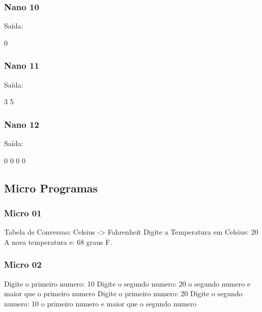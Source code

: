 \documentclass[12pt,a4paper,twoside]{report}
\begin{document}
\subsubsection{Nano 10}


Saída:
\begin{terminal}
0
\end{terminal}

\subsubsection{Nano 11}


Saída:
\begin{terminal}
3
5
\end{terminal}

\subsubsection{Nano 12}


Saída:
\begin{terminal}
0
0
0
0
\end{terminal}

\subsection{Micro Programas}
\subsubsection{Micro 01}


\begin{terminal}
Tabela de Conversao: Celsius -> Fahrenheit
Digite a Temperatura em Celsius: 20
A nova temperatura e: 68 graus F.
\end{terminal}

\subsubsection{Micro 02}


\begin{terminal}
Digite o primeiro numero: 10
Digite o segundo numero: 20
o segundo numero e maior que o primeiro numero
Digite o primeiro numero: 20
Digite o segundo numero: 10
o primeiro numero e maior que o segundo numero
\end{terminal}
\end{document}
